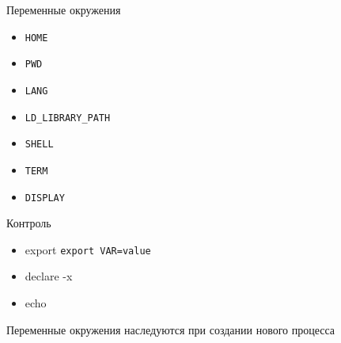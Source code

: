 \begin{frame}{Переменные окружения}
  \begin{itemize}
    \item {\tt HOME}
    \item {\tt PWD}
    \item {\tt LANG}
    \item {\tt LD\_LIBRARY\_PATH}
    \item {\tt SHELL}
    \item {\tt TERM}
    \item {\tt DISPLAY}
  \end{itemize}

  Контроль

  \begin{itemize}
    \item export {\tt export VAR=value}
    \item declare -x
    \item echo 
  \end{itemize}

  Переменные окружения наследуются при создании нового процесса
\end{frame}

%
%


